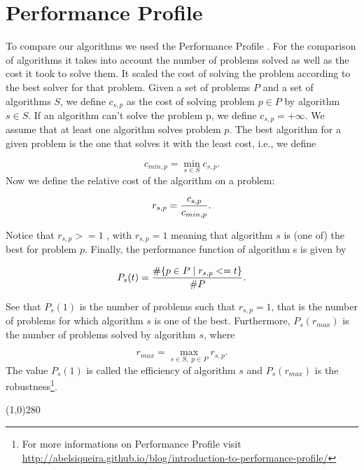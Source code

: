 \section{Performance Profile}
To compare our algorithms we used the Performance Profile \cite{dolan2002benchmarking}. For the comparison of algorithms it takes into account the number of problems solved as well as the cost it took to solve them. It scaled the cost of solving the problem according to the best solver for that problem. Given a set of problems $P$ and a set of algorithms $S$, we define $c_{s,p}$ as the cost of solving problem $p \in P$ by algorithm $s\in S$. If an algorithm can’t solve the problem p, we define $c_{s,p} = +\infty$. We assume that at least one algorithm solves problem $p$. The best algorithm for a given problem is the one that solves it with the least cost, i.e., we define

\begin{equation}
	c_{min,p} = \min_{s \in S} c_{s,p}.
\end{equation}
\noindent 
Now we define the relative cost of the algorithm on a problem:

\begin{equation}
	r_{s,p} = {c_{s,p} \over c_{min,p}}.
\end{equation}

\noindent 
Notice that $r_{s,p} >= 1$ , with $r_{s,p}=1$ meaning that algorithm $s$ is (one of) the best for problem $p$. Finally, the performance function of algorithm s is given by

\begin{equation}
	P_s(t) = {\#\{p \in P \;|\; r_{s,p} <= t \} \over \#P}.
\end{equation}

\noindent 
See that $P_s(1)$ is the number of problems such that $r_{s,p} = 1$, that is the number of problems for which algorithm $s$ is one of the best. Furthermore, $P_s(r_{max})$ is the number of problems solved by algorithm $s$, where

\begin{equation}
	r_{max} = \max_{s \in S,\; p \in P} r_{s,p}.
\end{equation}
\noindent
The value $P_s(1)$ is called the efficiency of algorithm $s$ and $P_s(r_{max})$ is the robustness\footnote{For more informations on Performance Profile visit \url{http://abelsiqueira.github.io/blog/introduction-to-performance-profile/}}.

\begin{center}
\line(1,0){280}
\end{center}

